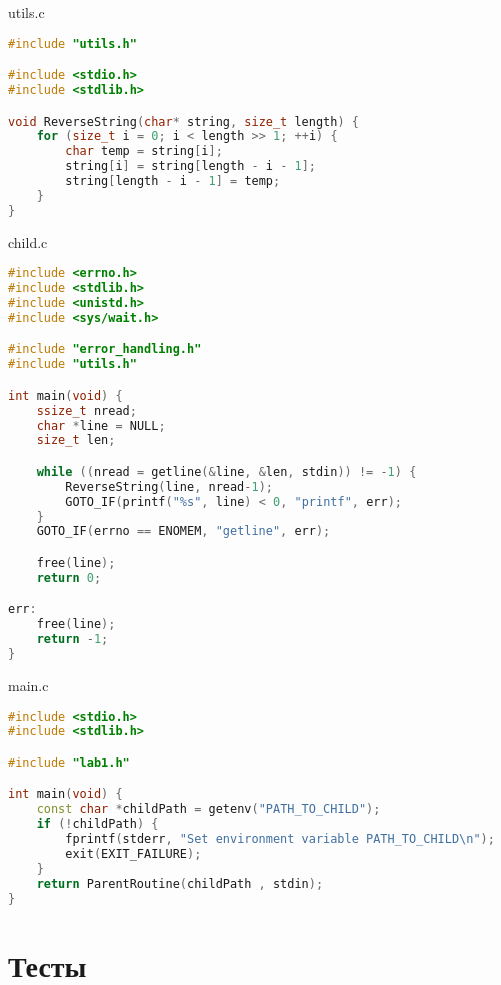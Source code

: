 \documentclass[a4paper, 12pt]{article}
\begin{document}
utils.c
\begin{lstlisting}[language=C++]
#include "utils.h"

#include <stdio.h>
#include <stdlib.h>

void ReverseString(char* string, size_t length) {
    for (size_t i = 0; i < length >> 1; ++i) {
        char temp = string[i];
        string[i] = string[length - i - 1];
        string[length - i - 1] = temp;
    }
}
\end{lstlisting}

child.c
\begin{lstlisting}[language=C++]
#include <errno.h>
#include <stdlib.h>
#include <unistd.h>
#include <sys/wait.h>

#include "error_handling.h"
#include "utils.h"

int main(void) {
    ssize_t nread;
    char *line = NULL;
    size_t len;

    while ((nread = getline(&line, &len, stdin)) != -1) {
        ReverseString(line, nread-1);
        GOTO_IF(printf("%s", line) < 0, "printf", err);
    }
    GOTO_IF(errno == ENOMEM, "getline", err);

    free(line);
    return 0;

err:
    free(line);
    return -1;
}
\end{lstlisting}

main.c
\begin{lstlisting}[language=C++]
#include <stdio.h>
#include <stdlib.h>

#include "lab1.h"

int main(void) {
    const char *childPath = getenv("PATH_TO_CHILD");
    if (!childPath) {
        fprintf(stderr, "Set environment variable PATH_TO_CHILD\n");
        exit(EXIT_FAILURE);
    }
    return ParentRoutine(childPath , stdin);
}
\end{lstlisting}

\newpage
\section{Тесты}
\end{document}

